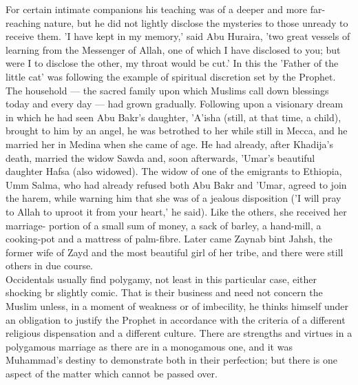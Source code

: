 \documentclass[10pt, twoside,openright]{book}
\begin{document}
For certain intimate companions his teaching was of a deeper and more far\hyp{}reaching nature, but he did 
not lightly disclose the mysteries to those unready to receive them. 'I have kept in my memory,' said 
Abu Huraira, 'two great vessels of learning from the Messenger of Allah, one of which I have 
disclosed to you; but were I to disclose the other, my throat would be cut.' In this the 'Father of 
the little cat' was following the example of spiritual discretion set by the Prophet. \\

The household --- the sacred family upon which Muslims call down blessings today and every day --- had 
grown gradually. Following upon a visionary dream in which he had seen Abu Bakr's daughter, 'A'isha 
(still, at that time, a child), brought to him by an angel, he was betrothed to her while still in 
Mecca, and he married her in Medina when she came of age. He had already, after Khadija's death, 
married the widow Sawda and, soon afterwards, 'Umar's beautiful daughter Hafsa (also widowed). The 
widow of one of the emigrants to Ethiopia, Umm Salma, who had already refused both Abu Bakr and 
'Umar, agreed to join the harem, while warning him that she was of a jealous disposition ('I will 
pray to Allah to uproot it from your heart,' he said). Like the others, she received her marriage\hyp{}
portion of a small sum of money, a sack of barley, a hand\hyp{}mill, a cooking\hyp{}pot and a mattress of 
palm\hyp{}fibre. Later came Zaynab bint Jahsh, the former wife of Zayd and the most beautiful girl of her 
tribe, and there were still others in due course. \\

Occidentals usually find polygamy, not least in this particular case, either shocking br slightly 
comic. That is their business and need not concern the Muslim unless, in a moment of weakness or of 
imbecility, he thinks himself under an obligation to justify the Prophet in accordance with the 
criteria of a different religious dispensation and a different culture. There are strengths and 
virtues in a polygamous marriage as there are in a monogamous one, and it was Muhammad's destiny to 
demonstrate both in their perfection; but there is one aspect of the matter which cannot be passed 
over. \\
\end{document}
